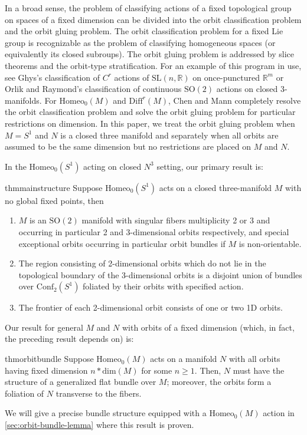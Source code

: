 \documentclass[10pt, oneside]{article}
\newcommand{\R}{\mathbb{R}}
\newcommand{\SO}[1][2]{\text{SO}(#1)}
\newcommand{\homeo}[1][S^1]{\text{Homeo}_0(#1)}
\newcommand{\diffr}[1][M]{\text{Diff}^r(#1)}
\newcommand{\conf}[2][S^1]{\text{Conf}_{#2}(#1)}
\newcommand{\SL}[1][2]{\text{SL}(#1, \R)}
\newcommand{\dimn}[1]{\text{dim}(#1)}
\theoremstyle{definition}
\theoremstyle{definition}
\begin{document}
In a broad sense, the problem of classifying actions of a fixed topological group on spaces of a fixed dimension can be divided into the orbit classification problem and the orbit gluing problem. The orbit classification problem for a fixed Lie group is recognizable as the problem of classifying homogeneous spaces (or equivalently its closed subroups). The orbit gluing problem is addressed by slice theorems and the orbit-type stratification. For an example of this program in use, see Ghys's classification of $C^r$ actions of $\SL[n]$ on once-punctured $\R^m$\cite{cairns:LocalLinearization} or Orlik and Raymond's classification of continuous $\SO$ actions on closed 3-manifolds\cite{orlik:ActionsSO2}. For $\homeo[M]$ and $\diffr$, Chen and Mann completely resolve the orbit classification problem and solve the orbit gluing problem for particular restrictions on dimension. In this paper, we treat the orbit gluing problem when $M= S^1$ and $N$ is a closed three manifold and separately when all orbits are assumed to be the same dimension but no restrictions are placed on $M$ and $N$. 

In the $\homeo[S^1]$ acting on closed $N^3$ setting, our primary result is:
\begin{restatable}{thm}{mainstructure}
\label{thm:main-structure-thm}
        Suppose $\homeo$ acts on a  closed three-manifold $M$ with no global fixed points, then 
        \begin{enumerate}
            \item $M$ is an $\SO$ manifold with singular fibers multiplicity 2 or 3 and occurring in particular 2 and 3-dimensional orbits respectively, and special exceptional orbits occurring in particular orbit bundles if $M$ is non-orientable.
            \item The region consisting of 2-dimensional orbits which do not lie in the topological boundary of the 3-dimensional orbits is a disjoint union of bundles over $\conf[S^1]{2}$ foliated by their orbits with specified action.
            \item The frontier of each 2-dimensional orbit consists of one or two 1D orbits.
        \end{enumerate}  
\end{restatable}
Our result for general $M$ and $N$ with orbits of a fixed dimension (which, in fact, the preceding result depends on) is:
\begin{restatable}{thm}{orbitbundle}
\label{thm:orbit-bundle}
    Suppose $\homeo[M]$ acts on a manifold $N$ with all orbits having fixed dimension $n*\dimn{M}$ for some $n\geq 1$. Then, $N$ must have the structure of a generalized flat bundle over $M$; moreover, the orbits form a foliation of $N$ transverse to the fibers.
\end{restatable}
We will give a precise bundle structure equipped with a $\homeo[M]$ action in \cref{sec:orbit-bundle-lemma} where this result is proven. 
\end{document}
